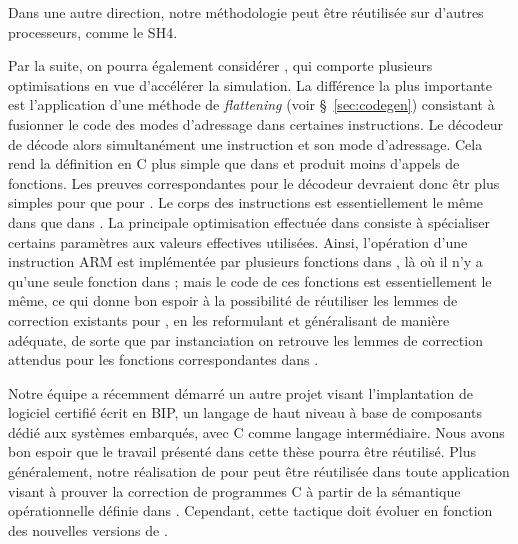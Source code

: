 Dans une autre direction, notre méthodologie peut être réutilisée sur
d'autres processeurs, comme le SH4.

Par la suite, on pourra également considérer ,
qui comporte plusieurs optimisations en vue d'accélérer
la simulation.
La différence la plus importante est l'application d'une
méthode de \emph{flattening} (voir \S~\ref{sec:codegen})
consistant à fusionner le code des modes d'adressage dans 
certaines instructions.
Le décodeur de  décode alors simultanément 
une instruction et son mode d'adressage.
Cela rend la définition en C plus simple que dans \simlight
et produit moins d'appels de fonctions.
Les preuves correspondantes pour le décodeur devraient donc êtr
plus simples pour  que pour \simlight.
%
Le corps des instructions est essentiellement le même dans 
que dans \simlight.
La principale optimisation effectuée dans  consiste à
spécialiser certains paramètres aux valeurs effectives utilisées.
Ainsi, l'opération d'une instruction ARM est implémentée
par plusieurs fonctions dans , là où il n'y a qu'une seule fonction
dans \simlight ;
mais le code de ces fonctions est essentiellement le même,
ce qui donne bon espoir à la possibilité de réutiliser
les lemmes de correction existants pour \simlight,
en les reformulant et généralisant de manière adéquate,
de sorte que par instanciation on retrouve les lemmes
de correction attendus pour les fonctions correspondantes dans .

Notre équipe a récemment démarré un autre projet visant
l'implantation de logiciel certifié écrit en BIP,
un langage de haut niveau à base de composants dédié aux systèmes embarqués,
avec \compcert C comme langage intermédiaire.
Nous avons bon espoir que le travail présenté dans cette thèse
pourra être réutilisé.
%
Plus généralement,
notre réalisation de \hcinv pour \compcert peut être réutilisée
dans toute application visant à prouver la correction de programmes C
à partir de la sémantique opérationnelle définie dans \compcert.
Cependant, cette tactique doit évoluer en fonction 
des nouvelles versions de \compcert.




